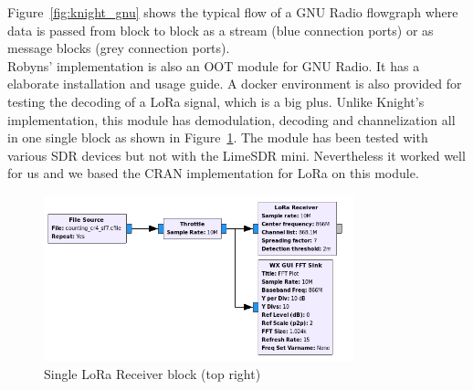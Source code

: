 Figure~\ref{fig:knight_gnu} shows the typical flow of a GNU Radio flowgraph where data is passed 
from block to block as a stream (blue connection ports) or as message blocks (grey connection ports).
\\
Robyns' implementation is also an OOT module for GNU Radio. It has a elaborate 
installation and usage guide. A docker environment is also provided for testing the 
decoding of a LoRa signal, which is a big plus. Unlike Knight's implementation, this module
has demodulation, decoding and channelization all in one single block as shown in Figure~\ref{fig:robyns_gnu}. 
The module has been tested with various SDR devices but not with the LimeSDR mini. Nevertheless it worked
well for us and we based the CRAN implementation for LoRa on this module.

\begin{figure}[h]
    \centering
    \includegraphics[width=0.8\textwidth]{figures/robyns_gnu.png}
    \caption{Single LoRa Receiver block (top right)~\cite{robyns_implementation}}
    \label{fig:robyns_gnu}
\end{figure}

